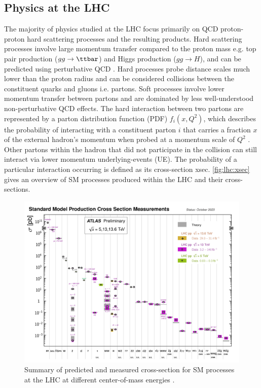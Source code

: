 \documentclass[../thesis.tex]{subfiles}
\begin{document}
\subsection{Physics at the LHC}
The majority of physics studied at the \acs{LHC} focus primarily on \acs{QCD} proton-proton hard scattering processes and the resulting products. Hard scattering processes involve large momentum transfer compared to the proton mass e.g. top pair production ($gg\rightarrow\ttbar$) and Higgs production ($gg\rightarrow H$), and can be predicted using perturbative \acs{QCD} \citep{theory:hard_process}. Hard processes probe distance scales much lower than the proton radius and can be considered collisions between the constituent quarks and gluons i.e. partons. Soft processes involve lower momentum transfer between partons and are dominated by less well-understood non-perturbative \acs{QCD} effects. The hard interaction between two partons are represented by a parton distribution function (\acs{PDF}) $f_i(x, Q^2)$, which describes the probability of interacting with a constituent parton $i$ that carries a fraction $x$ of the external hadron's momentum when probed at a momentum scale of $Q^2$ \citep{theory:hard_process2}. Other partons within the hadron that did not participate in the collision can still interact via lower momentum underlying-events (\acs{UE}). The probability of a particular interaction occurring is defined as its cross-section \acs{xsec}. \autoref{fig:lhc:xsec} gives an overview of \acs{SM} processes produced within the \acs{LHC} and their cross-sections. 

\begin{figure}[!htb]
\begin{center}
\includegraphics[width=\linewidth]{fig/lhc_xsec_Run23.png}
\caption[Summary of predicted and measured cross-section for SM processes at the LHC at different center-of-mass energies]{\label{fig:lhc:xsec}Summary of predicted and measured cross-section for \acs{SM} processes at the \acs{LHC} at different center-of-mass energies \citep{ATL-PHYS-PUB-2023-039}.}
\end{center}
\end{figure}
\end{document}
